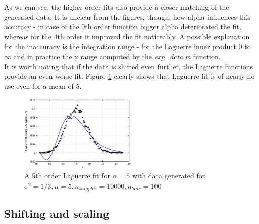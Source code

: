 \documentclass[a4paper]{article}
\numberwithin{equation}{section}
\begin{document}
\noindent As we can see, the higher order fits also provide a closer matching of the generated data. It is unclear from the figures, though, how alpha influences this accuracy - in case of the 0th order function bigger alpha deteriorated the fit, whereas for the 4th order it improved the fit noticeably. A possible explanation for the inaccuracy is the integration range - for the Laguerre inner product $0$ to $\infty$ and in practice the x range computed by the \textit{exp\_data.m} function.\\

\noindent It is worth noting that if the data is shifted even further, the Laguerre functions provide an even worse fit. Figure \ref{fig:poorfit} clearly shows that Laguerre fit is of nearly no use even for a mean of 5. \\

\begin{figure}[!h]
\centering
\includegraphics[width=0.5\textwidth]{poor_fit.eps}
\caption{\label{fig:poorfit}A 5th order Laguerre fit for $\alpha=5$ with data generated for $\sigma^2=1/3, \mu=5, n_{samples} = 10000, n_{bins} = 100$}
\end{figure}

\subsection{Shifting and scaling}
\end{document}
